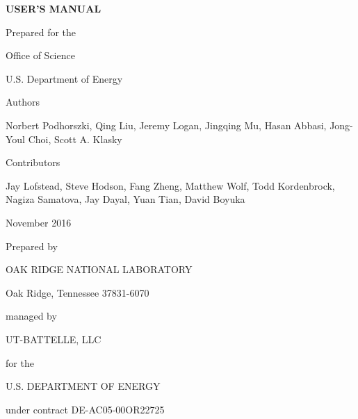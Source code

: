 \begin{center}
{\Large \textbf{\adiosversion USER'S MANUAL}}

\vspace{60pt}
Prepared for the

Office of Science

U.S. Department of Energy

\vspace{60pt}
Authors

\vspace{6pt}
Norbert Podhorszki, Qing Liu, Jeremy Logan, Jingqing Mu, Hasan Abbasi, Jong-Youl Choi, Scott A. Klasky

\vspace{30pt}
Contributors 

\vspace{6pt}
Jay Lofstead, Steve Hodson, Fang Zheng, Matthew Wolf, Todd Kordenbrock, Nagiza Samatova, Jay Dayal, Yuan Tian, David Boyuka

\vspace{72pt}
November  2016

\vspace{72pt}
Prepared by

OAK RIDGE NATIONAL LABORATORY

Oak Ridge, Tennessee 37831-6070

managed by

UT-BATTELLE, LLC

for the

U.S. DEPARTMENT OF ENERGY

under contract DE-AC05-00OR22725

\end{center}


\newpage

\tableofcontents


\newpage

\listoffigures


\newpage

